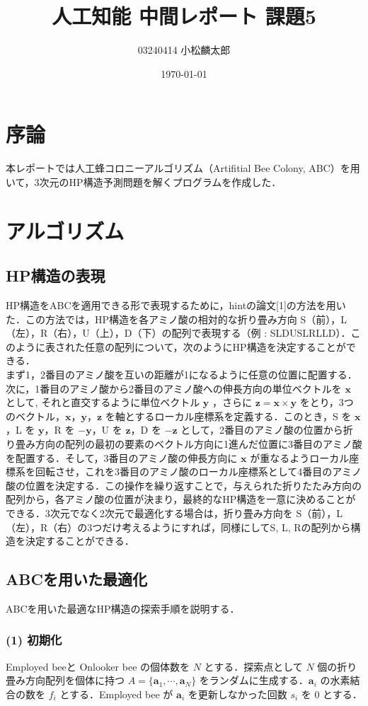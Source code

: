 \documentclass[a4paper, 10pt,  twocolumn]{ltjsarticle}
\title{人工知能 中間レポート 課題5}
\author{03240414  小松麟太郎}
\date{\today}
\begin{document}
\maketitle

\section{序論}
本レポートでは人工蜂コロニーアルゴリズム（Artifitial Bee Colony, ABC）を用いて，3次元のHP構造予測問題を解くプログラムを作成した．
\section{アルゴリズム}
\subsection{HP構造の表現}
HP構造をABCを適用できる形で表現するために，hintの論文[1]の方法を用いた．この方法では，HP構造を各アミノ酸の相対的な折り畳み方向 S（前），L（左），R（右），U（上），D（下）の配列で表現する（例 : SLDUSLRLLD）．このように表された任意の配列について，次のようにHP構造を決定することができる．\\
\quad まず1，2番目のアミノ酸を互いの距離が1になるように任意の位置に配置する．次に，1番目のアミノ酸から2番目のアミノ酸への伸長方向の単位ベクトルを $\boldsymbol{x}$ として, それと直交するように単位ベクトル $\boldsymbol{y}$ ，さらに $\boldsymbol{z} = \boldsymbol{x}\times\boldsymbol{y}$ をとり，3つのベクトル，$\boldsymbol{x}$，$\boldsymbol{y}$，$\boldsymbol{z}$ を軸とするローカル座標系を定義する．このとき，S を $\boldsymbol{x}$，L を $\boldsymbol{y}$，R を $-\boldsymbol{y}$，U を $\boldsymbol{z}$，D を $-\boldsymbol{z}$ として，2番目のアミノ酸の位置から折り畳み方向の配列の最初の要素のベクトル方向に1進んだ位置に3番目のアミノ酸を配置する．そして，3番目のアミノ酸の伸長方向に $\boldsymbol{x}$ が重なるようローカル座標系を回転させ，これを3番目のアミノ酸のローカル座標系として4番目のアミノ酸の位置を決定する．この操作を繰り返すことで，与えられた折りたたみ方向の配列から，各アミノ酸の位置が決まり，最終的なHP構造を一意に決めることができる．3次元でなく2次元で最適化する場合は，折り畳み方向を S（前），L（左），R（右）の3つだけ考えるようにすれば，同様にしてS, L, Rの配列から構造を決定することができる．
\subsection{ABCを用いた最適化}
ABCを用いた最適なHP構造の探索手順を説明する．
\subsubsection*{(1) 初期化}
Employed beeと Onlooker bee の個体数を $N$ とする．探索点として $N$ 個の折り畳み方向配列を個体に持つ $A = \{\boldsymbol{a}_1,\cdots, \boldsymbol{a}_N\}$ をランダムに生成する．$\boldsymbol{a}_i$ の水素結合の数を $f_i$ とする．Employed bee が $\boldsymbol{a}_i$ を更新しなかった回数 $s_i$ を $0$ とする．
\end{document}

